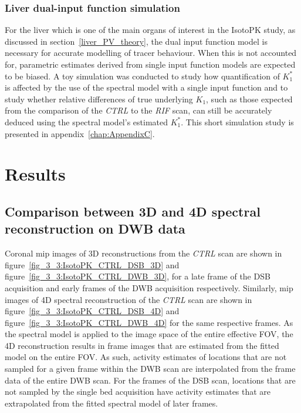 \subsubsection{Liver dual-input function simulation}
For the liver which is one of the main organs of interest in the IsotoPK study, as discussed in section~\ref{liver_PV_theory}, the dual input function model is necessary for accurate modelling of tracer behaviour. 
When this is not accounted for, parametric estimates derived from single input function models are expected to be biased.  
A toy simulation was conducted to study how quantification of $K_1^{*}$ is affected by the use of the spectral model with a single input function and to study whether relative differences of true underlying $K_1$, such as those expected from the comparison of the \textit{CTRL} to the \textit{RIF} scan, can still be accurately deduced using the spectral model's estimated $K_1^{*}$. This short simulation study is presented in appendix~\ref{chap:AppendixC}.

\section{Results}
\subsection{Comparison between 3D and 4D spectral reconstruction on DWB data}
Coronal \gls{mip} images of 3D reconstructions from the \textit{CTRL} scan are shown in figure~\ref{fig_3_3:IsotoPK_CTRL_DSB_3D} and figure~\ref{fig_3_3:IsotoPK_CTRL_DWB_3D}, for a late frame of the DSB acquisition and early frames of the DWB acquisition respectively. 
Similarly, \gls{mip} images of 4D spectral reconstruction of the \textit{CTRL} scan are shown in figure~\ref{fig_3_3:IsotoPK_CTRL_DSB_4D} and figure~\ref{fig_3_3:IsotoPK_CTRL_DWB_4D} for the same respective frames. 
As the spectral model is applied to the image space of the entire effective FOV, the 4D reconstruction results in frame images that are estimated from the fitted model on the entire FOV. As such, activity estimates of locations that are not sampled for a given frame within the DWB scan are interpolated from the frame data of the entire DWB scan. For the frames of the DSB scan, locations that are not sampled by the single bed acquisition have activity estimates that are extrapolated from the fitted spectral model of later frames.

